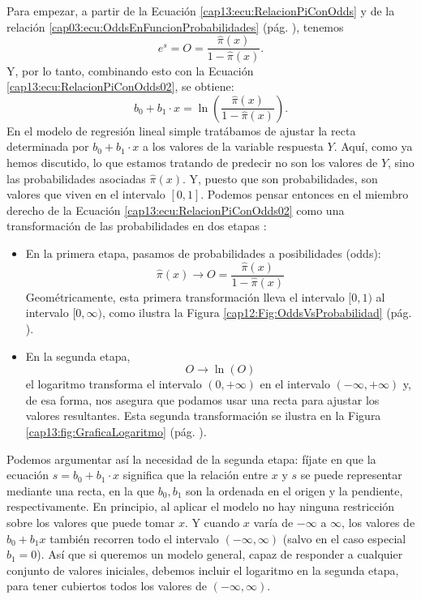 Para empezar, a partir de la Ecuación \ref{cap13:ecu:RelacionPiConOdds} y de la relación \ref{cap03:ecu:OddsEnFuncionProbabilidades} (pág. \pageref{cap03:ecu:OddsEnFuncionProbabilidades}), tenemos
\[
e^s = O = \dfrac{\hat\pi(x)}{1-\hat\pi(x)}.
\]
Y, por lo tanto, combinando esto con la Ecuación \ref{cap13:ecu:RelacionPiConOdds02}, se obtiene:
\begin{equation}
\label{cap13:ecu:RelacionPiConOdds03}
b_0+b_1\cdot x = \ln\left(\dfrac{\hat\pi(x)}{1-\hat\pi(x)}\right).
\end{equation}
En el modelo de regresión lineal simple tratábamos de ajustar la recta determinada por $b_0+b_1\cdot x$ a los valores de la variable respuesta $Y$. Aquí, como ya hemos discutido, lo que estamos tratando de predecir no son los valores de $Y$, sino las probabilidades asociadas $\hat\pi(x)$. Y, puesto que son probabilidades, son valores que viven en el intervalo $[0,1]$. Podemos pensar entonces en el miembro derecho de la Ecuación \ref{cap13:ecu:RelacionPiConOdds02} como una transformación de las probabilidades en dos etapas :
\begin{itemize}
  \item En la primera etapa, pasamos de probabilidades a posibilidades (odds):
        \[
        \hat\pi(x) \longrightarrow O=\dfrac{\hat\pi(x)}{1-\hat\pi(x)}
        \]
        Geométricamente, esta primera transformaci\'on lleva el intervalo $[0,1)$ al intervalo $[0,\infty)$, como ilustra la Figura \ref{cap12:Fig:OddsVsProbabilidad} (pág.  \pageref{cap12:Fig:OddsVsProbabilidad}).
  \item En la segunda etapa,
        \[
        O \longrightarrow \ln(O)
        \]
        el logaritmo transforma el intervalo $(0,+\infty)$ en el intervalo $(-\infty,+\infty)$ y, de esa forma, nos asegura que podamos usar una recta para ajustar los valores resultantes. Esta segunda transformación se ilustra en la Figura \ref{cap13:fig:GraficaLogaritmo} (pág. \pageref{cap13:fig:GraficaLogaritmo}).
\end{itemize}
Podemos argumentar así la necesidad de la segunda etapa: fíjate en que la ecuación $s=b_0 + b_1 \cdot x$ significa que la relación entre $x$ y $s$ se puede representar mediante una recta, en la que $b_0, b_1$ son la ordenada en el origen y la pendiente, respectivamente. En principio, al aplicar el modelo no hay ninguna restricción sobre los valores que puede tomar $x$. Y cuando $x$ varía de $-\infty$ a $\infty$, los valores de $b_0 + b_1 x$ también recorren todo el intervalo $(-\infty, \infty)$ (salvo en el caso especial $b_1=0$). Así que si queremos un modelo general, capaz de responder a cualquier conjunto de valores iniciales, debemos incluir el logaritmo en la segunda etapa, para tener cubiertos todos los valores de  $(-\infty, \infty)$.

